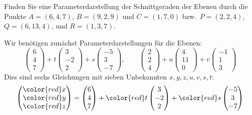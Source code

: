 Finden Sie eine Parameterdarstellung der Schnittgeraden der Ebenen
durch die Punkte $A=(6,4,7)$, $B=(9,2,9)$ und $C=(1,7,0)$ bzw.~$P=(2,2,4)$,
$Q=(6,13,4)$, und $R=(1,3,7)$.


\begin{loesung}
Wir benötigen zunächst Parameterdarstellungen für die Ebenen:
\[
\begin{pmatrix}6\\4\\7\end{pmatrix}
+t
\begin{pmatrix}3\\-2\\2\end{pmatrix}
+s
\begin{pmatrix}-5\\3\\-7\end{pmatrix}
,\qquad
\begin{pmatrix}2\\2\\4\end{pmatrix}
+u
\begin{pmatrix}4\\11\\0\end{pmatrix}
+v
\begin{pmatrix}-1\\1\\3\end{pmatrix}
\]
Dies sind 
sechs Gleichungen mit sieben Unbekannten $x,y,z,u,v,s,t$:
\begin{align*}
\begin{pmatrix}
{\color{red}x}\\
{\color{red}y}\\
{\color{red}z}
\end{pmatrix}=
\begin{pmatrix}6\\4\\7\end{pmatrix}
+{\color{red}t}
\begin{pmatrix}3\\-2\\2\end{pmatrix}
+{\color{red}s}
\begin{pmatrix}-5\\3\\-7\end{pmatrix}
\\

\end{align*}
\end{loesung}
